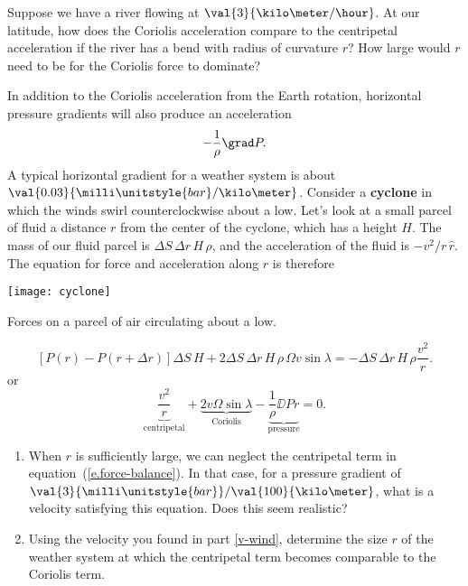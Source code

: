 \begin{exercisebox}
Suppose we have a river flowing at $\val{3}{\kilo\meter/\hour}$.  At our latitude, how does the Coriolis acceleration compare to the centripetal acceleration if the river has a bend with radius of curvature $r$?  How large would $r$ need to be for the Coriolis force to dominate?
\end{exercisebox}

In addition to the Coriolis acceleration from the Earth rotation, horizontal pressure gradients will also produce an acceleration
\[
	-\frac{1}{\rho}\grad P.
\]
A typical horizontal gradient for a weather system is about $\val{0.03}{\milli\unitstyle{bar}/\kilo\meter}$. Consider a \textbf{cyclone} in which the winds swirl counterclockwise about a low.  Let's look at a small parcel of fluid a distance $r$ from the center of the cyclone, which has a height $H$. The mass of our fluid parcel is $\Delta S\,\Delta r\,H\,\rho$, and the acceleration of the fluid is $-v^{2}/r\,\hat{r}$. The equation for force and acceleration along $\hat{r}$ is therefore
\begin{marginfigure}
\texttt{[image: cyclone]}
\caption{Forces on a parcel of air circulating about a low.
\label{f.cyclone}}
\end{marginfigure}
\[
	\left[P(r)-P(r+\Delta r)\right]\Delta S\,H + 2\Delta S\,\Delta r\,H\,\rho\,\Omega v\sin\lambda = -\Delta S\,\Delta r\,H\,\rho \frac{v^{2}}{r}.
\]
or
\begin{equation}\label{e.force-balance}
	\underbrace{\frac{v^{2}}{r}}_{\textrm{centripetal}} 
	+ \underbrace{2 v\Omega\sin\lambda}_{\mathrm{Coriolis}} 
	- \underbrace{\frac{1}{\rho}\DD{P}{r}}_{\mathrm{pressure}} = 0.
\end{equation}

\begin{exercisebox}
\begin{enumerate}
\renewcommand{\theenumi}{\alph{enumi}}
\renewcommand{\labelenumi}{\alph{enumi})}
\item\label{v-wind}
When $r$ is sufficiently large, we can neglect the centripetal term in equation~(\ref{e.force-balance}).  In that case, for a pressure gradient of $\val{3}{\milli\unitstyle{bar}}/\val{100}{\kilo\meter}$, what is a velocity satisfying this equation. Does this seem realistic?

\item Using the velocity you found in part \ref{v-wind}, determine the size $r$ of the weather system at which the centripetal term becomes comparable to the Coriolis term.
\end{enumerate}
\end{exercisebox}

